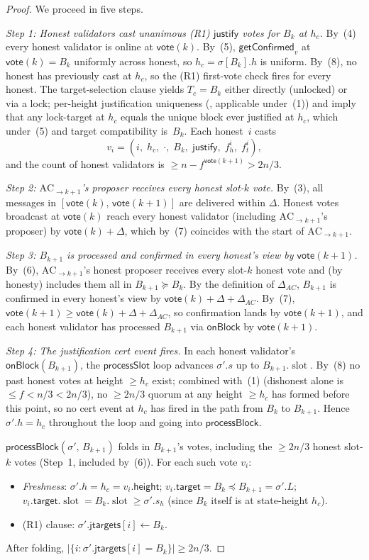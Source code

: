 \ifx\litemode\undefined\documentclass{article}\fi
\newcommand{\slot}[0]{\ensuremath{\operatorname{\mathrm{slot}}}}
\newcommand{\target}{\mathsf{target}}
\newcommand{\height}{\mathsf{height}}
\newcommand{\just}{\ensuremath{\mathsf{justify}}\xspace}
\newcommand{\jtargets}{\mathsf{jtargets}}
\newcommand{\vote}{\mathsf{vote}}
\newcommand{\processSlot}{\textsf{processSlot}\xspace}
\newcommand{\processBlock}{\textsf{processBlock}\xspace}
\newcommand{\onBlock}{\textsf{onBlock}\xspace}
\newcommand{\getConfirmed}{\textsf{getConfirmed}\xspace}
\theoremstyle{plain}
\theoremstyle{definition}
\theoremstyle{remark}
\begin{document}
\begin{proof}
We proceed in five steps.

\emph{Step 1: Honest validators cast unanimous \mbox{(R1)} \just votes for $B_k$ at $h_c$.}
By~(4) every honest validator is online at $\vote(k)$. By~(5), $\getConfirmed_v$ at $\vote(k) = B_k$ uniformly across honest, so $h_c = \sigma[B_k].h$ is uniform. By~(8), no honest has previously cast at $h_c$, so the \mbox{(R1)} first-vote check fires for every honest. The target-selection clause yields $T_c = B_k$ either directly (unlocked) or via a lock; per-height justification uniqueness (, applicable under~(1)) and  imply that any lock-target at $h_c$ equals the unique block ever justified at $h_c$, which under~(5) and target compatibility is~$B_k$. Each honest~$i$ casts
\[
  v_i = (i,\; h_c,\; \cdot,\; B_k,\; \just,\; f_h^i,\; f_t^i),
\]
and the count of honest validators is $\geq n - f^{\vote(k+1)} > 2n/3$.

\emph{Step 2: $\mathrm{AC}_{\to k+1}$'s proposer receives every honest slot-$k$ vote.}
By~(3), all messages in $[\vote(k),\, \vote(k+1)]$ are delivered within $\Delta$. Honest votes broadcast at $\vote(k)$ reach every honest validator (including $\mathrm{AC}_{\to k+1}$'s proposer) by $\vote(k) + \Delta$, which by~(7) coincides with the start of $\mathrm{AC}_{\to k+1}$.

\emph{Step 3: $B_{k+1}$ is processed and confirmed in every honest's view by $\vote(k+1)$.}
By~(6), $\mathrm{AC}_{\to k+1}$'s honest proposer receives every slot-$k$ honest vote and (by honesty) includes them all in $B_{k+1} \succeq B_k$. By the definition of $\Delta_{AC}$, $B_{k+1}$ is confirmed in every honest's view by $\vote(k) + \Delta + \Delta_{AC}$. By~(7), $\vote(k+1) \geq \vote(k) + \Delta + \Delta_{AC}$, so confirmation lands by $\vote(k+1)$, and each honest validator has processed $B_{k+1}$ via $\onBlock$ by $\vote(k+1)$.

\emph{Step 4: The justification cert event fires.}
In each honest validator's $\onBlock(B_{k+1})$, the $\processSlot$ loop advances $\sigma'.s$ up to $B_{k+1}.\slot$. By~(8) no past honest votes at height $\geq h_c$ exist; combined with~(1) (dishonest alone is $\leq f < n/3 < 2n/3$), no $\geq 2n/3$ quorum at any height $\geq h_c$ has formed before this point, so no cert event at $h_c$ has fired in the path from $B_k$ to $B_{k+1}$. Hence $\sigma'.h = h_c$ throughout the loop and going into $\processBlock$.

$\processBlock(\sigma',\, B_{k+1})$ folds in $B_{k+1}$'s votes, including the $\geq 2n/3$ honest slot-$k$ votes (Step~1, included by~(6)). For each such vote $v_i$:
\begin{itemize}
  \item \emph{Freshness}: $\sigma'.h = h_c = v_i.\height$; $v_i.\target = B_k \preceq B_{k+1} = \sigma'.L$; $v_i.\target.\slot = B_k.\slot \geq \sigma'.s_h$ (since $B_k$ itself is at state-height $h_c$).
  \item \mbox{(R1)} clause: $\sigma'.\jtargets[i] \gets B_k$.
\end{itemize}
After folding, $|\{i : \sigma'.\jtargets[i] = B_k\}| \geq 2n/3$.


\end{proof}
\end{document}

